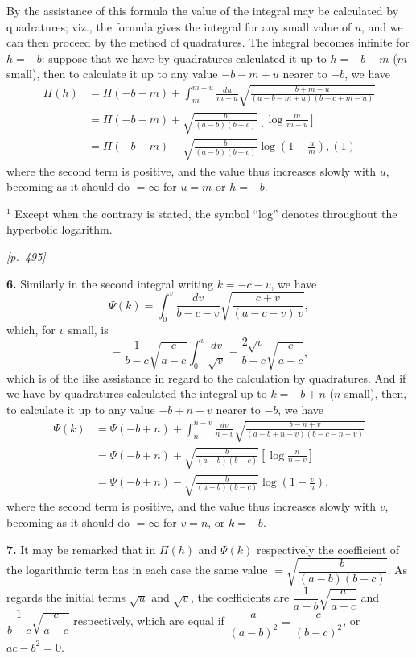 \documentclass[11pt]{article}
\begin{document}
By the assistance of this formula the value of the integral may be
calculated by quadratures; viz., the formula gives the integral for any
small value of $u$, and we can then proceed by the method of quadratures.
The integral becomes infinite for $h=-b$: suppose that we have by
quadratures calculated it up to $h=-b-m$ ($m$ small), then to calculate
it up to any value $-b-m+u$ nearer to $-b$, we have
\begin{align*}
\Pi(h) &= \Pi(-b-m)+\int_{m}^{m-u}\frac{du}{m-u}\sqrt{\frac{b+m-u}{(a-b-m+u)(b-c+m-u)}}\\
&= \Pi(-b-m)+\sqrt{\frac{b}{(a-b)(b-c)}}\left[\log\frac{m}{m-u}\right]\\
&= \Pi(-b-m)-\sqrt{\frac{b}{(a-b)(b-c)}}\log\!\left(1-\frac{u}{m}\right),(1)
\end{align*}
where the second term is positive, and the value thus increases slowly with
$u$, becoming as it should do $=\infty$ for $u=m$ or $h=-b$.

\medskip

\noindent\footnotesize $^{1}$ Except when the contrary is stated, the symbol
``log'' denotes throughout the hyperbolic logarithm.\normalsize

\medskip

\noindent\textit{[p.~495]}

\medskip

\textbf{6.} Similarly in the second integral writing $k=-c-v$, we have
\[
\Psi(k)=\int_{0}^{v}\frac{dv}{b-c-v}\sqrt{\frac{c+v}{(a-c-v)\,v}},
\]
which, for $v$ small, is
\[
=\frac{1}{b-c}\sqrt{\frac{c}{a-c}}\int_{0}^{v}\frac{dv}{\sqrt{v}}
=\frac{2\sqrt{v}}{b-c}\sqrt{\frac{c}{a-c}},
\]
which is of the like assistance in regard to the calculation by
quadratures. And if we have by quadratures calculated the integral up to
$k=-b+n$ ($n$ small), then, to calculate it up to any value $-b+n-v$
nearer to $-b$, we have
\begin{align*}
\Psi(k) &= \Psi(-b+n)+\int_{n}^{n-v}\frac{dv}{n-v}\sqrt{\frac{b-n+v}{(a-b+n-v)(b-c-n+v)}}\\
&= \Psi(-b+n)+\sqrt{\frac{b}{(a-b)(b-c)}}\left[\log\frac{n}{n-v}\right]\\
&= \Psi(-b+n)-\sqrt{\frac{b}{(a-b)(b-c)}}\log\!\left(1-\frac{v}{n}\right),
\end{align*}
where the second term is positive, and the value thus increases slowly with
$v$, becoming as it should do $=\infty$ for $v=n$, or $k=-b$.

\textbf{7.} It may be remarked that in $\Pi(h)$ and $\Psi(k)$ respectively
the coefficient of the logarithmic term has in each case the same value
$=\sqrt{\dfrac{b}{(a-b)(b-c)}}$. As regards the initial terms $\sqrt{u}$
and $\sqrt{v}$, the coefficients are $\dfrac{1}{a-b}\sqrt{\dfrac{a}{a-c}}$
and $\dfrac{1}{b-c}\sqrt{\dfrac{c}{a-c}}$ respectively, which are equal if
$\dfrac{a}{(a-b)^{2}}=\dfrac{c}{(b-c)^{2}}$, or $ac-b^{2}=0$.
\end{document}
